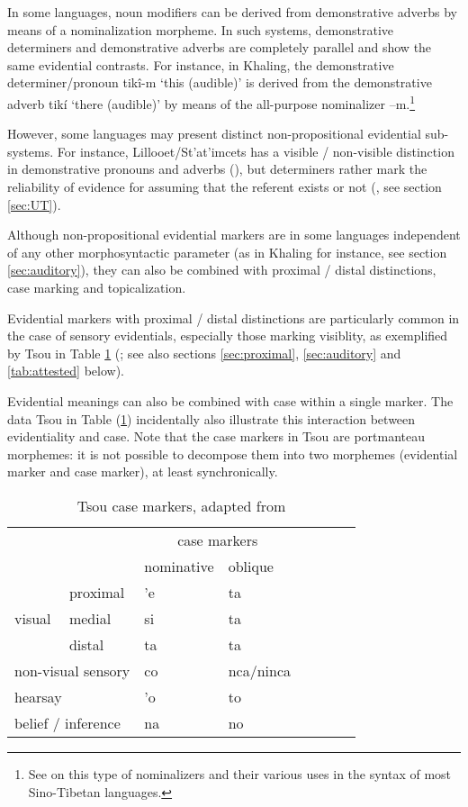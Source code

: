 \documentclass[oneside,a4paper,11pt]{article}
\newcommand{\ipa}[1]{{\phon \mbox{#1}}} %
\begin{document}
In some languages, noun modifiers can be derived from demonstrative adverbs by means of a nominalization morpheme. In such systems, demonstrative determiners and demonstrative adverbs are completely parallel and show the same evidential contrasts. For instance, in Khaling, the demonstrative determiner/pronoun \ipa{tikî-m} `this (audible)' is derived from the demonstrative adverb \ipa{tikí} `there (audible)' by means of the all-purpose nominalizer \ipa{--m}.\footnote{See \citet{bickel99nmlz} on this type of nominalizers and their various uses in the syntax of most Sino-Tibetan languages.}

However, some languages may present distinct non-propositional evidential sub-systems. For instance, Lillooet/St'at'imcets has a visible / non-visible distinction in demonstrative pronouns and adverbs (\citealt[169, 171]{eijk97lillooet}), but determiners rather mark the reliability of evidence for assuming that the referent exists or not (\citealt{matthewson98determiners, gutierrez12determiners}, see section \ref{sec:UT}).

Although non-propositional evidential markers are in some languages independent of any other morphosyntactic parameter (as in Khaling for instance, see section \ref{sec:auditory}), they can also be combined with  proximal / distal distinctions, case marking and topicalization.

Evidential markers with proximal / distal distinctions are particularly common in the case of sensory evidentials, especially those marking visiblity, as exemplified by Tsou in Table \ref{tab:tsou} (\citealt{tung64tsou, yang00tsou.case}; see also sections \ref{sec:proximal}, \ref{sec:auditory} and \ref{tab:attested} below). 

Evidential meanings can also be combined with case within a single marker. The data Tsou in Table (\ref{tab:tsou}) incidentally also illustrate this interaction between evidentiality and case. Note that the case markers in Tsou are portmanteau morphemes: it is not possible to decompose them into two morphemes (evidential marker and case marker), at least synchronically.  
 
\begin{table}[H]
 \caption{Tsou case markers, adapted from \citet[54]{yang00tsou.case}} \centering \label{tab:tsou}
\begin{tabular}{llllllll}
\toprule
	 & 	 & 	\multicolumn{2}{c}{case markers } 	 \\	
	 & 	 & 	nominative & 	oblique \\	
\midrule
	 & 	proximal & 	\ipa{'e} & 	\ipa{ta} \\ 	
visual	 & 	medial & 	\ipa{si} & 	\ipa{ta}  \\ 	
	 & 	distal & 	\ipa{ta} & 	\ipa{ta}  \\ 	
\multicolumn{2}{l}{non-visual sensory}  	 & 	\ipa{co} & 	\ipa{nca/ninca} \\ 	
	 \midrule
\multicolumn{2}{l}{hearsay}	 & 	\ipa{'o} & 	\ipa{to} \\ 	
\multicolumn{2}{l}{belief / inference} 	 & 	\ipa{na} & 	\ipa{no} \\ 	
\bottomrule
\end{tabular}
\end{table} 
\end{document}
